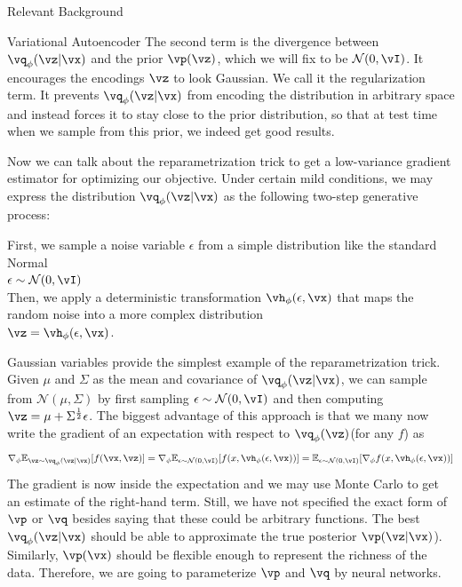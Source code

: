 \documentclass{article}
\begin{document}
\begin{psection}{Relevant Background}
\begin{psubsection}{Variational Autoencoder}
    The second term is the divergence between $\vq_\phi(\vz|\vx)$ and the prior $\vp(\vz)$, which we will fix to be $\mathcal{N}(0,\vI)$. It encourages the encodings $\vz$ to look Gaussian. We call it the regularization term. It prevents $\vq_\phi(\vz|\vx)$ from encoding the distribution in arbitrary space and instead forces it to stay close to the prior distribution, so that at test time when we sample from this prior, we indeed get good results.

    Now we can talk about the reparametrization trick to get a low-variance gradient estimator for optimizing our objective. Under certain mild conditions, we may express the distribution $\vq_\phi(\vz|\vx)$ as the following two-step generative process:
    \begin{center}
        First, we sample a noise variable $\epsilon$ from a simple distribution like the standard Normal\\ $\epsilon\sim\mathcal{N}(0,\vI)$\\
        Then, we apply a deterministic transformation $\vh_\phi(\epsilon,\vx)$ that maps the random noise into a more complex distribution\\
        $\vz=\vh_\phi(\epsilon,\vx)$.
    \end{center}
    Gaussian variables provide the simplest example of the reparametrization trick. Given $\mu$ and $\Sigma$ as the mean and covariance of $\vq_\phi(\vz|\vx)$, we can sample from $\mathcal{N}(\mu,\Sigma)$ by first sampling  $\epsilon\sim\mathcal{N}(0,\vI)$ and then computing $\vz=\mu+\Sigma^{\frac{1}{2}}\epsilon$. The biggest advantage of this approach is that we many now write the gradient of an expectation with respect to $\vq_\phi(\vz)$(for any $f$) as
    \begin{align*}
        \nabla_\phi \mathbb{E}_{\vz\sim\vq_\phi(\vz|\vx)} [f(\vx,\vz)] = \nabla_\phi \mathbb{E}_{\epsilon\sim\mathcal{N}(0,\vI)}[f(x,\vh_\phi(\epsilon,\vx))] = \mathbb{E}_{\epsilon\sim\mathcal{N}(0,\vI)}[\nabla_\phi f(x,\vh_\phi(\epsilon,\vx))]
    \end{align*}
    The gradient is now inside the expectation and we may use Monte Carlo to get an estimate of the right-hand term. Still, we have not specified the exact form of $\vp$ or $\vq$ besides saying that these could be arbitrary functions. The best $\vq_\phi(\vz|\vx)$ should be able to approximate the true posterior $\vp(\vz|\vx)$). Similarly, $\vp(\vx)$ should be flexible enough to represent the richness of the data. Therefore, we are going to parameterize $\vp$ and $\vq$ by neural networks.
\end{psubsection}
\end{psection}
\end{document}
